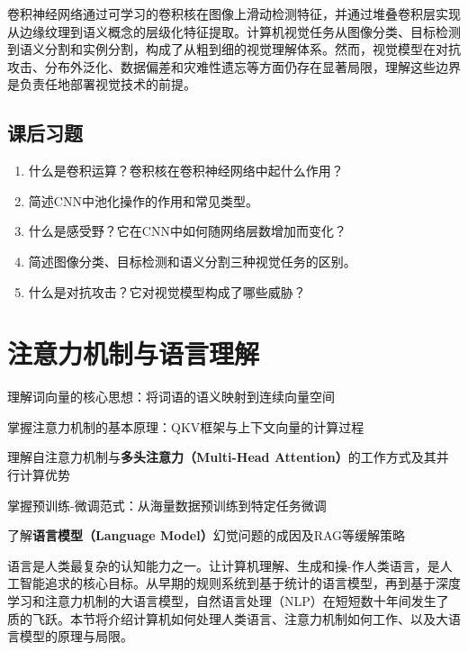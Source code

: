卷积神经网络通过可学习的卷积核在图像上滑动检测特征，并通过堆叠卷积层实现从边缘纹理到语义概念的层级化特征提取。计算机视觉任务从图像分类、目标检测到语义分割和实例分割，构成了从粗到细的视觉理解体系。然而，视觉模型在对抗攻击、分布外泛化、数据偏差和灾难性遗忘等方面仍存在显著局限，理解这些边界是负责任地部署视觉技术的前提。

\bigskip
\subsection*{课后习题}

\begin{enumerate}
\setlength{\itemsep}{6pt}
\item 什么是卷积运算？卷积核在卷积神经网络中起什么作用？
\item 简述CNN中池化操作的作用和常见类型。
\item 什么是感受野？它在CNN中如何随网络层数增加而变化？
\item 简述图像分类、目标检测和语义分割三种视觉任务的区别。
\item 什么是对抗攻击？它对视觉模型构成了哪些威胁？
\end{enumerate}


\newpage
\section{注意力机制与语言理解}


\begin{sectionkeypoints}
\item 理解词向量的核心思想：将词语的语义映射到连续向量空间
\item 掌握注意力机制的基本原理：QKV框架与上下文向量的计算过程
\item 理解自注意力机制与\textbf{多头注意力（Multi-Head Attention）}的工作方式及其并行计算优势
\item 掌握预训练-微调范式：从海量数据预训练到特定任务微调
\item 了解\textbf{语言模型（Language Model）}幻觉问题的成因及RAG等缓解策略
\end{sectionkeypoints}




语言是人类最复杂的认知能力之一。让计算机理解、生成和操-作人类语言，是人工智能追求的核心目标。从早期的规则系统到基于统计的语言模型，再到基于深度学习和注意力机制的大语言模型，自然语言处理（NLP）在短短数十年间发生了质的飞跃。本节将介绍计算机如何处理人类语言、注意力机制如何工作、以及大语言模型的原理与局限。




